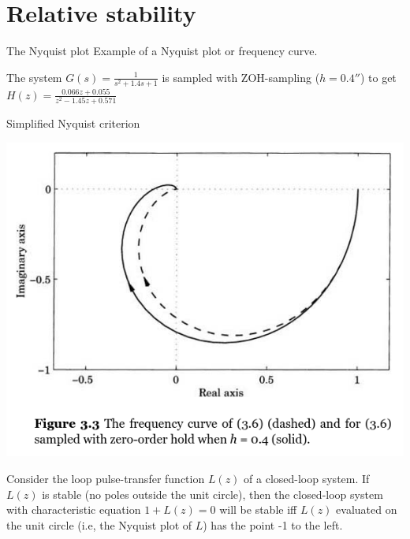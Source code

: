 \documentclass[presentation,aspectratio=169]{beamer}
\begin{document}
\section{Relative stability}
\label{sec-5}

\begin{frame}[label=sec-5-1]{The Nyquist plot}
Example of a \alert{Nyquist plot} or \alert{frequency curve}.
\begin{center}
\end{center}



The system \(G(s) = \frac{1}{s^2 + 1.4s + 1}\) is sampled with ZOH-sampling (\(h=\unit{0.4}{\second}\)) to get \(H(z) = \frac{0.066z + 0.055}{z^2 - 1.45 z + 0.571}\)
\end{frame}

\begin{frame}[label=sec-5-2]{Simplified Nyquist criterion}
\begin{center}
\includegraphics[width=0.4\linewidth]{../../figures/fig3-3.png}
\end{center}

Consider the loop pulse-transfer function $L(z)$ of a closed-loop system. If $L(z)$ is stable (no poles outside the unit circle), then the closed-loop system with characteristic equation $1 + L(z) = 0$ will be stable iff $L(z)$ evaluated on the unit circle (i.e, the Nyquist plot of $L$) has the point \alert{-1 to the left}.
\end{frame}
\end{document}
